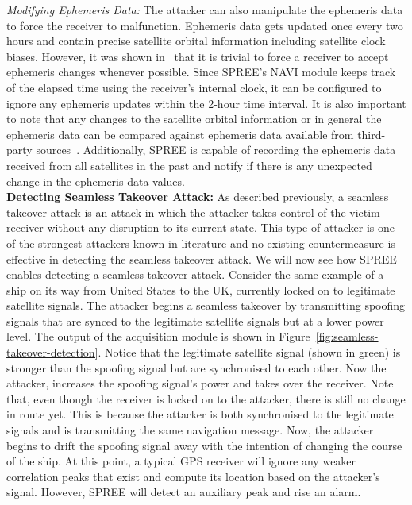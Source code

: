 \documentclass[letterpaper,twocolumn,10pt]{article}
\newcommand{\rxname}{SPREE\xspace}
\begin{document}
\noindent\textit{Modifying Ephemeris Data:} The attacker can also manipulate the ephemeris data to force the receiver to malfunction. Ephemeris data gets updated once every two hours and contain precise satellite orbital information including satellite clock biases. However, it was shown in~\cite{NighswanderCCS2012} that it is trivial to force a receiver to accept ephemeris changes whenever possible. Since \rxname's NAVI module keeps track of the elapsed time using the receiver's internal clock, it can be configured to ignore any ephemeris updates within the 2-hour time interval. It is also important to note that any changes to the satellite orbital information or in general the ephemeris data can be compared against ephemeris data available from third-party sources~\cite{nasa_dailyephemeris}. Additionally, \rxname is capable of recording the ephemeris data received from all satellites in the past and notify if there is any unexpected change in the ephemeris data values.\\ 









\noindent\textbf{Detecting Seamless Takeover Attack:} As described previously, a seamless takeover attack is an attack in which the attacker takes control of the victim receiver without any disruption to its current state. This type of attacker is one of the strongest attackers known in literature and no existing countermeasure is effective in detecting the seamless takeover attack. We will now see how \rxname enables detecting a seamless takeover attack. Consider the same example of a ship on its way from United States to the UK, currently locked on to legitimate satellite signals. The attacker begins a seamless takeover by transmitting spoofing signals that are synced to the legitimate satellite signals but at a lower power level. The output of the acquisition module is shown in Figure~\ref{fig:seamless-takeover-detection}. Notice that the legitimate satellite signal (shown in green) is stronger than the spoofing signal but are synchronised to each other. Now the attacker, increases the spoofing signal’s power and takes over the receiver. Note that, even though the receiver is locked on to the attacker, there is still no change in route yet. This is because the attacker is both synchronised to the legitimate signals and is transmitting the same navigation message. Now, the attacker begins to drift the spoofing signal away with the intention of changing the course of the ship. At this point, a typical GPS receiver will ignore any weaker correlation peaks that exist and compute its location based on the attacker’s signal. However, SPREE will detect an auxiliary peak and rise an alarm.\\
\end{document}
